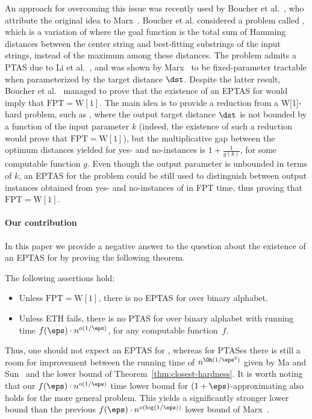 An approach for overcoming this issue was recently used by Boucher et al.~\cite{Boucher15}, who attribute the original idea to Marx~\cite{Marx08-survey}. Boucher et al. considered a problem called \cPattern, which is a variation of \clSubstring where the goal function is the total sum of Hamming distances between the center string and best-fitting substrings of the input strings, instead of the maximum among these distances. The problem admits a PTAS due to Li et al.~\cite{LiMW02a}, and was shown by Marx~\cite{Marx08} to be fixed-parameter tractable when parameterized by the target distance $\dst$. Despite the latter result, Boucher et al.~\cite{Boucher15} managed to prove that the existence of an EPTAS for \cPattern would imply that $\mathrm{FPT}=\mathrm{W[1]}$. The main idea is to provide a reduction from a W[1]-hard problem, such as \clique, where the output target distance $\dst$ is not bounded by a function of the input parameter $k$ (indeed, the existence of such a reduction would prove that $\mathrm{FPT}=\mathrm{W}[1]$), but the multiplicative gap between the optimum distances yielded for yes- and no-instances is $1+\frac{1}{g(k)}$, for some computable function $g$. Even though the output parameter is unbounded in terms of $k$, an EPTAS for the problem could be still used to distinguish between output instances obtained from yes- and no-instances of \clique in FPT time, thus proving that $\mathrm{FPT}=\mathrm{W[1]}$.

\paragraph*{Our contribution} In this paper we provide a negative answer to the question about the existence of an EPTAS for \clString by proving the following theorem.

\begin{theorem}\label{thm:closest-hardness}
The following assertions hold:
\begin{itemize}
\item Unless $\mathrm{FPT}=\mathrm{W[1]}$, there is no EPTAS for \clString over binary alphabet.
\item Unless ETH fails, there is no PTAS for \clString over binary alphabet with running time $f(\eps)\cdot n^{o(1/\eps)}$, for any computable function~$f$.
\end{itemize}
\end{theorem}

Thus, one should not expect an EPTAS for \clString, whereas for PTASes there is still a room for improvement between the running time of $n^{\Oh(1/\eps^2)}$ given by Ma and Sun~\cite{MaS09} and the lower bound of Theorem~\ref{thm:closest-hardness}. It is worth noting that our $f(\eps)\cdot n^{o(1/\eps)}$ time lower bound for $(1+\eps)$-approximating \clString also holds for the more general \clSubstring problem. This yields a significantly stronger lower bound than the previous $f(\eps)\cdot n^{o(\log (1/\eps))}$ lower bound of Marx~\cite{Marx08}.

